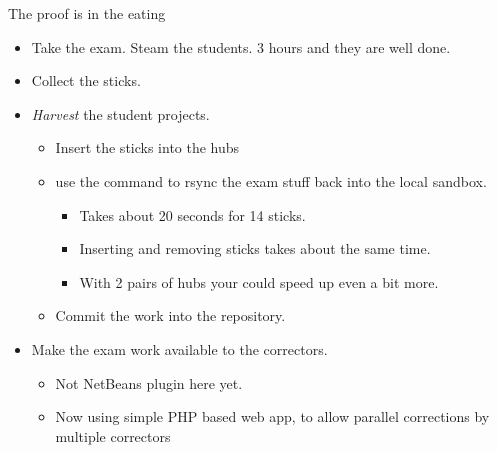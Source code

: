\begin{frame}{The proof is in the eating}
  \begin{itemize}
  \item Take the exam. Steam the students. 3 hours and they are well done.
  \item Collect the sticks.
  \item \textit{Harvest} the student projects.
    \begin{itemize}
    \item Insert the sticks into the hubs
    \item use the command  to rsync the exam stuff
      back into the local sandbox.
      \begin{itemize}
      \item Takes about 20 seconds for 14 sticks.\\
      \item Inserting and removing sticks takes about the same time.
    \item With 2 pairs of hubs your could speed up even a bit more.
    \end{itemize}
  \item Commit the work into the repository.
  \end{itemize}
  \item Make the exam work available to the correctors.
    \begin{itemize}
    \item Not NetBeans plugin here yet\InlineMwha.
    \item Now using simple PHP based web app, to allow parallel
      corrections by multiple correctors
    \end{itemize}

  \end{itemize}
\end{frame}

